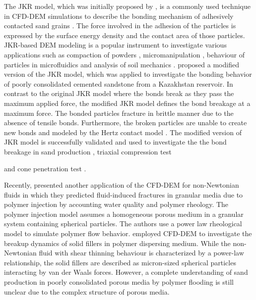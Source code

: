 \documentclass{article}
\begin{document}
The JKR model, which was initially proposed by \cite{johnson1971surface}, is a commonly used technique in CFD-DEM simulations to describe the bonding mechanism of adhesively contacted sand grains \citep{zhou2022calibration}. 
The force involved in the adhesion of the particles is expressed by the surface energy density and the contact area of those particles. JKR-based DEM modeling is a popular instrument to investigate various applications such as compaction of powders \citep{garner2018study}, micromanipulation \citep{fang2006dynamic}, behaviour of particles in microfluidics \citep{shahzad2018aggregation} and analysis of soil mechanics \citep{qiu2022calibration}.
\cite{rakhimzhanova2019numerical} proposed a modified version of the JKR model, which was applied to investigate the  bonding behavior of poorly consolidated cemented sandstone from a Kazakhstan reservoir. In contrast to the original JKR model where the bonds break as they pass the maximum applied force, the modified JKR model defines the bond breakage at a maximum force.  The bonded particles fracture in brittle manner due to the absence of tensile bonds. Furthermore, the broken particles are unable to create new bonds and modeled by the Hertz contact model \citep{hertz1882ueber}. The modified version of JKR model is successfully validated and used to investigate the the bond breakage in sand production \citep{rakhimzhanova2022numerical,khamitov2021coupled}, triaxial compression test {\citep{rakhimzhanova2019numerical, kazidenov2022coarseconf} and cone penetration test \citep{rakhimzhanova2021numerical}.

Recently, \cite{li2023simulation} presented another application of the CFD-DEM for non-Newtonian fluids in which they predicted fluid-induced fractures in granular media due to polymer injection by accounting water quality and polymer rheology. The polymer injection model assumes a homogeneous porous medium in a granular system containing spherical particles. The authors use a power law rheological model to simulate polymer flow behavior. \citep{frungieri2022cfd} employed CFD-DEM to investigate the breakup dynamics of solid fillers in polymer dispersing medium. While the non-Newtonian fluid with shear thinning behaviour is characterized by a power-law relationship, the solid fillers are described as micron-sized spherical particles interacting by van der Waals forces. However, a complete understanding of sand production in poorly consolidated porous media by polymer flooding is still unclear due to the complex structure of porous media.  

}
\end{document}
